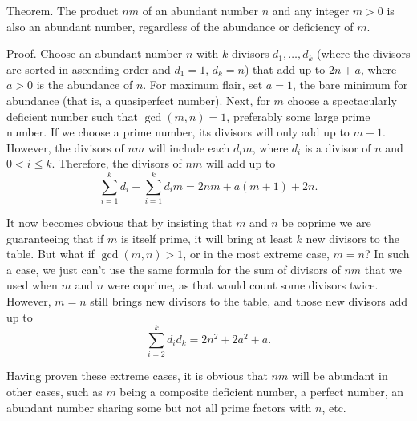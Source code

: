\documentclass[12pt]{article}
\begin{document}
Theorem. The product $nm$ of an abundant number $n$ and any integer $m > 0$ is also an abundant number, regardless of the abundance or deficiency of $m$.

Proof. Choose an abundant number $n$ with $k$ divisors $d_1, \ldots ,d_k$ (where the divisors are sorted in ascending order and $d_1 = 1$, $d_k = n$) that add up to $2n + a$, where $a > 0$ is the abundance of $n$. For maximum flair, set $a = 1$, the bare minimum for abundance (that is, a quasiperfect number). Next, for $m$ choose a spectacularly deficient number such that $\gcd(m, n) = 1$, preferably some large prime number. If we choose a prime number, its divisors will only add up to $m + 1$. However, the divisors of $nm$ will include each $d_im$, where $d_i$ is a divisor of $n$ and $0 < i \le k$. Therefore, the divisors of $nm$ will add up to $$\sum_{i = 1}^k d_i + \sum_{i = 1}^k d_im = 2nm + a(m + 1) + 2n.$$

It now becomes obvious that by insisting that $m$ and $n$ be coprime we are guaranteeing that  if $m$ is itself prime, it will bring at least $k$ new divisors to the table. But what if $\gcd(m, n) > 1$, or in the most extreme case, $m = n$? In such a case, we just can't use the same formula for the sum of divisors of $nm$ that we used when $m$ and $n$ were coprime, as that would count some divisors twice. However, $m = n$ still brings new divisors to the table, and those new divisors add up to $$\sum_{i = 2}^k d_id_k = 2n^2 + 2a^2 + a.$$

Having proven these extreme cases, it is obvious that $nm$ will be abundant in other cases, such as $m$ being a composite deficient number, a perfect number, an abundant number sharing some but not all prime factors with $n$, etc.
\end{document}
